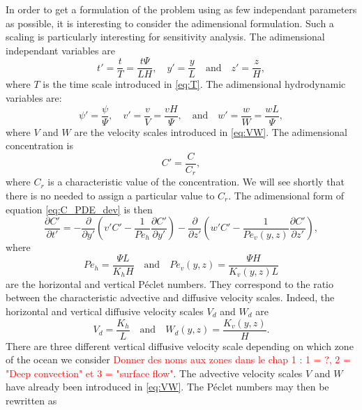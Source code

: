 In order to get a formulation of the problem using as few independant parameters as possible, it is interesting to consider the adimensional formulation. Such a scaling is particularly interesting for sensitivity analysis. The adimensional independant variables are
\begin{equation}
	t' = \frac{t}{T} = \frac{t\Psi}{LH}, \quad y' = \frac{y}{L} \quad \mbox{and} \quad z' = \frac{z}{H},   	
\end{equation}
where $T$ is the time scale introduced in \eqref{eq:T}. The adimensional hydrodynamic variables are:
\begin{equation}
	\psi' = \frac{\psi}{\Psi}, \quad v' = \frac{v}{V} = \frac{vH}{\Psi}, \quad \mbox{and} \quad w' = \frac{w}{W} = \frac{wL}{\Psi},
\end{equation}
where $V$ and $W$ are the velocity scales introduced in \eqref{eq:VW}. The adimensional concentration is
\begin{equation}
	C' = \frac{C}{C_r}, 	
\end{equation}
where $C_r$ is a characteristic value of the concentration. We will see shortly that there is no needed to assign a particular value to $C_r$. The adimensional form of equation \eqref{eq:C_PDE_dev} is then
\begin{equation}\label{eq:PDE_adim}
	\frac{\partial C'}{\partial t'} = -\frac{\partial}{\partial y'}\left(v'C' - \frac{1}{Pe_h}\frac{\partial C'}{\partial y'}\right) -\frac{\partial}{\partial z'}\left(w'C' - \frac{1}{Pe_v(y,z)}\frac{\partial C'}{\partial z'}\right),
\end{equation}
where
\begin{equation}
	Pe_h = \frac{\Psi L}{K_h H} \quad \mbox{and} \quad Pe_v(y,z) = \frac{\Psi H}{K_v(y,z)L}
\end{equation}
are the horizontal and vertical Péclet numbers. They correspond to the ratio between the characteristic advective and diffusive velocity scales. Indeed, the horizontal and vertical diffusive velocity scales $V_{d}$ and $W_{d}$ are 
\begin{equation}
	V_{d} = \frac{K_h}{L} \quad \mbox{and} \quad W_{d}(y,z) = \frac{K_v(y,z)}{H}.
\end{equation}
There are three different vertical diffusive velocity scale depending on which zone of the ocean we consider \textcolor{red}{Donner des noms aux zones dans le chap 1 : 1 = ?, 2 = "Deep convection" et 3 = "surface flow"}. The advective velocity scales $V$ and $W$ have already been introduced in \eqref{eq:VW}. The Péclet numbers may then be rewritten as
